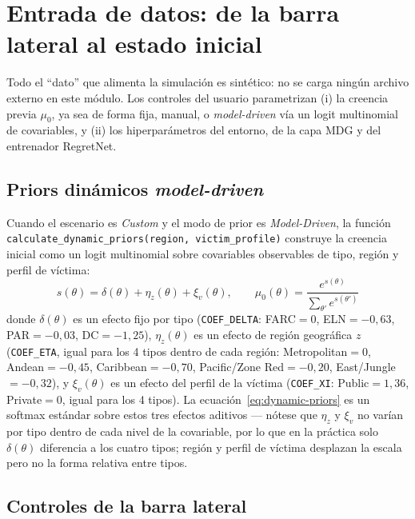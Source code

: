 \documentclass[ecta,nameyear,draft]{econsocart}
\newcommand{\pyvar}[1]{\texttt{#1}}
\begin{document}
\section{Entrada de datos: de la barra lateral al estado inicial}

Todo el ``dato'' que alimenta la simulación es sintético: no se carga ningún archivo externo
en este módulo. Los controles del usuario parametrizan (i) la creencia previa $\mu_0$, ya sea
de forma fija, manual, o \emph{model-driven} vía un logit multinomial de covariables, y (ii)
los hiperparámetros del entorno, de la capa MDG y del entrenador RegretNet.

\subsection{Priors dinámicos \emph{model-driven}}

Cuando el escenario es \emph{Custom} y el modo de prior es \emph{Model-Driven}, la función
\pyvar{calculate\_dynamic\_priors(\allowbreak region, victim\_profile)} construye la creencia
inicial como un logit multinomial sobre covariables observables de tipo, región y perfil de
víctima:
\begin{equation}
s(\theta) = \delta(\theta) + \eta_z(\theta) + \xi_v(\theta),
\qquad
\mu_0(\theta) = \frac{e^{s(\theta)}}{\sum_{\theta'} e^{s(\theta')}}
\label{eq:dynamic-priors}
\end{equation}
donde $\delta(\theta)$ es un efecto fijo por tipo (\pyvar{COEF\_DELTA}: FARC$=0$, ELN$=-0{,}63$,
PAR$=-0{,}03$, DC$=-1{,}25$), $\eta_z(\theta)$ es un efecto de región geográfica $z$
(\pyvar{COEF\_ETA}, igual para los 4 tipos dentro de cada región: Metropolitan$=0$,
Andean$=-0{,}45$, Caribbean$=-0{,}70$, Pacific/Zone Red$=-0{,}20$, East/Jungle$=-0{,}32$), y
$\xi_v(\theta)$ es un efecto del perfil de la víctima (\pyvar{COEF\_XI}: Public$=1{,}36$,
Private$=0$, igual para los 4 tipos). La ecuación~\eqref{eq:dynamic-priors} es un softmax
estándar sobre estos tres efectos aditivos --- nótese que $\eta_z$ y $\xi_v$ no varían por tipo
dentro de cada nivel de la covariable, por lo que en la práctica solo $\delta(\theta)$
diferencia a los cuatro tipos; región y perfil de víctima desplazan la escala pero no la forma
relativa entre tipos.

\subsection{Controles de la barra lateral}
\end{document}
